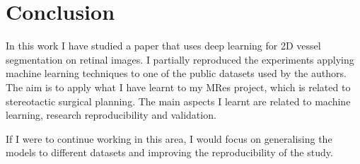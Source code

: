 \section{Conclusion}


In this work I have studied a paper that uses deep learning for 2D vessel segmentation on retinal images. I partially reproduced the experiments applying machine learning techniques to one of the public datasets used by the authors. The aim is to apply what I have learnt to my MRes project, which is related to stereotactic surgical planning. The main aspects I learnt are related to machine learning, research reproducibility and validation.



If I were to continue working in this area, I would focus on generalising the models to different datasets and improving the reproducibility of the study.

